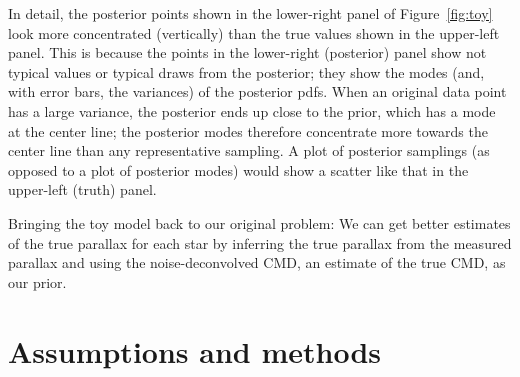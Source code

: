 \documentclass[modern]{aastex61}
\newcommand{\acronym}[1]{{\small{#1}}}
\newcommand{\cmd}{\acronym{CMD}}
\begin{document}
In detail, the posterior points shown in the lower-right panel of
Figure~\ref{fig:toy} look more concentrated (vertically) than the true
values shown in the upper-left panel.
This is because the points in the lower-right (posterior) panel show
not typical values or typical draws from the posterior; they show the
modes (and, with error bars, the variances) of the posterior pdfs.
When an original data point has a large variance, the posterior ends
up close to the prior, which has a mode at the center line; the
posterior modes therefore concentrate more towards the center line
than any representative sampling.
A plot of posterior samplings (as opposed to a plot of posterior modes) would
show a scatter like that in the upper-left (truth) panel.

Bringing the toy model back to our original problem:
We can get better estimates of the true parallax for each star by inferring the true parallax from the measured parallax and using the noise-deconvolved \cmd, an estimate of the true \cmd, as our prior.

\section{Assumptions and methods}\label{sec:method}
\end{document}
